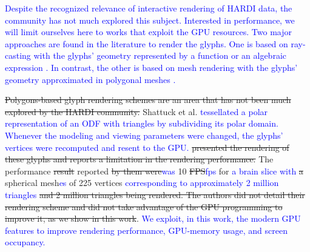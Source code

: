 \documentclass[twoside,twocolumn,10pt]{article}
\begin{document}
\textcolor{blue}{ Despite the recognized relevance of interactive rendering of HARDI data, the community has not much explored this subject. Interested in performance, we will limit ourselves here to works that exploit the GPU resources. Two major approaches are found in the literature to render the glyphs. One is based on ray-casting with the glyphs' geometry represented by a function or an algebraic expression \cite{???}. In contrast, the other is based on mesh rendering with the glyphs' geometry approximated in polygonal meshes \cite{???}.} 

\sout{Polygons-based glyph rendering schemes are an area that has not been much explored by the HARDI community.} Shattuck et al. \cite{shattuck2008} \textcolor{blue}{tessellated a polar representation of an ODF with triangles by subdividing its polar domain. Whenever the modeling and viewing parameters were changed, the glyphs' vertices were recomputed and resent to the GPU.} \sout{presented the rendering of these glyphs and reports a limitation in the rendering performance.} The performance \sout{result} reported \sout{by them were}\textcolor{blue}{was} 10 \sout{FPS}\textcolor{blue}{fps} for \textcolor{blue}{a brain slice with} \sout{a} spherical mesh\textcolor{blue}{es} of 225 vertices \textcolor{blue}{corresponding to approximately 2 million triangles} \sout{and 2 million triangles being rendered. The authors did not detail their rendering scheme and did not take advantage of the GPU programming to improve it, as we show in this work}. \textcolor{blue}{We exploit, in this work, the modern GPU features to improve rendering performance, GPU-memory usage, and screen occupancy.}


\end{document}
